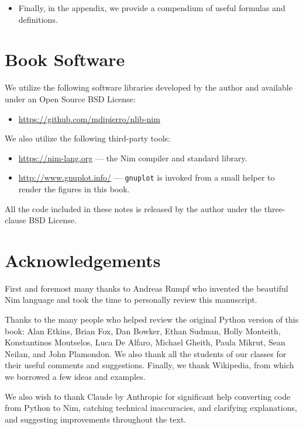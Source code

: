 \documentclass[justified, sixbynine]{tufte-book}
\def\ft{\small\tt}
\theoremstyle{plain}%
\newtheorem * {corollary}{Corollary}
\theoremstyle{definition}
\theoremstyle{remark}
\newtheorem * {remark}{Remark}
\newtheorem * {note}{Note}
\begin{document}
\begin{fullwidth}
\begin{itemize}
\item Finally, in the appendix, we provide a compendium of useful formulas and definitions.
\end{itemize}

\section{Book Software}

We utilize the following software libraries developed by the author and available under an Open Source BSD License:

\begin{itemize}
\item \url{https://github.com/mdipierro/nlib-nim}
\end{itemize}

We also utilize the following third-party tools:

\begin{itemize}
\item \url{https://nim-lang.org} --- the Nim compiler and standard library.
\item \url{http://www.gnuplot.info/} --- {\ft gnuplot} is invoked from a small helper to render the figures in this book.
\end{itemize}

All the code included in these notes is released by the author under the three-clause BSD License.

\section * {Acknowledgements}

First and foremost many thanks to Andreas Rumpf who invented the beautiful Nim language and took the time to personally review this manuscript.

Thanks to the many people who helped review the original Python version of this book: Alan Etkins, Brian Fox, Dan Bowker, Ethan Sudman, Holly Monteith, Konstantinos Moutselos, Luca De Alfaro, Michael Gheith, Paula Mikrut, Sean Neilan, and John Plamondon.
We also thank all the students of our classes for their useful comments and suggestions.
Finally, we thank Wikipedia, from which we borrowed a few ideas and examples.

We also wish to thank Claude by Anthropic for significant help converting code from Python to Nim, catching technical inaccuracies, and clarifying explanations, and suggesting improvements throughout the text.


\end{fullwidth}
\end{document}

